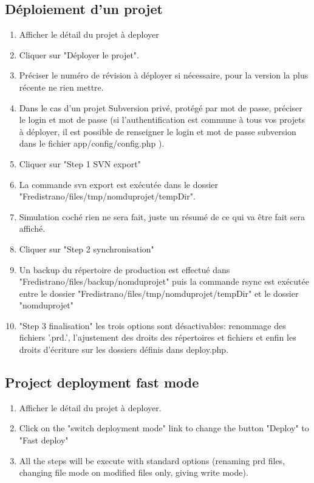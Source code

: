 \documentclass[12pt,a4paper]{report}
\begin{document}
\subsection{Déploiement d'un projet}
\begin{enumerate}
\item Afficher le détail du projet à deployer
\item Cliquer sur "Déployer le projet".
\item Préciser le numéro de révision à déployer si nécessaire, pour la version la plus récente ne rien mettre.
\item Dans le cas d'un projet Subversion privé, protégé par mot de passe, préciser le login et mot de passe (si l'authentification est commune à tous vos projets à déployer, il est possible de renseigner le login et mot de passe subversion dans le fichier app/config/config.php ).
\item Cliquer sur "Step 1 SVN export"
\item La commande svn export est exécutée dans le dossier "Fredistrano/files/tmp/nomduprojet/tempDir".
\item Simulation coché rien ne sera fait, juste un résumé de ce qui va être fait sera affiché.
\item Cliquer sur "Step 2 synchronisation"
\item Un backup du répertoire de production est effectué dans "Fredistrano/files/backup/nomduprojet" puis la commande rsync est exécutée entre le dossier "Fredistrano/files/tmp/nomduprojet/tempDir" et le dossier "nomduprojet"
\item "Step 3 finalisation" les trois options sont désactivables: renommage des fichiers '.prd.', l'ajustement des droits des répertoires et fichiers et enfin les droits d'écriture sur les dossiers définis dans deploy.php.
\end{enumerate}

\subsection{Project deployment fast mode}
\begin{enumerate}
\item Afficher le détail du projet à deployer.
\item Click on the "switch deployment mode" link to change the button "Deploy" to "Fast deploy"
\item All the steps will be execute with standard options (renaming prd files, changing file mode on modified files only, giving write mode). 
\end{enumerate}
\end{document}
